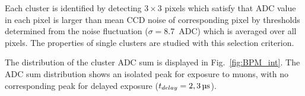 \documentclass[preprint,3p,twocolumn]{elsarticle}
\begin{document}
Each cluster is identified by detecting $3 \times 3$ pixels which satisfy that
ADC value in each pixel is larger than mean CCD noise of corresponding pixel by thresholds determined from the noise fluctuation ($\sigma=$\SI{8.7}{ADC}) which is averaged over all pixels. The properties of single
clusters are studied with this selection criterion. 

%
The distribution of the cluster ADC sum is displayed in
Fig.~\ref{fig:BPM_int}.  The ADC sum distribution shows an
isolated peak for exposure to muons, with no corresponding peak
for delayed exposure
($t_{delay} = \SIlist[list-pair-separator = {, }, list-units =
single]{2; 3}{\micro\s}$).
\end{document}
